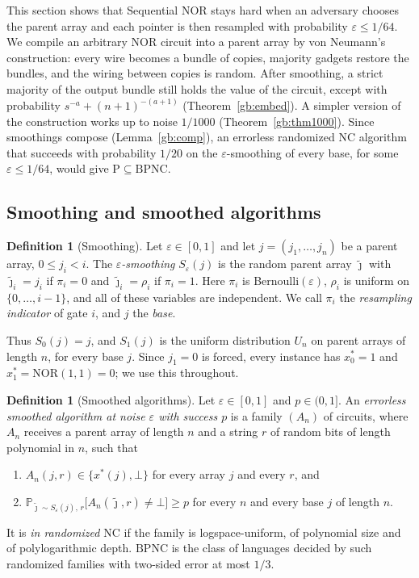 \documentclass[11pt]{amsart}
\theoremstyle{definition}
\newtheorem{definition}[theorem]{Definition}
\theoremstyle{remark}
\newcommand{\eps}{\varepsilon}
\newcommand{\jt}{\tilde{\jmath}}
\newcommand{\NOR}{\mathrm{NOR}}
\newcommand{\PP}{\mathbb{P}}
\begin{document}
This section shows that Sequential NOR stays hard when an adversary chooses
the parent array and each pointer is then resampled with probability
$\eps\le 1/64$. We compile an arbitrary NOR circuit into a parent array by von
Neumann's construction: every wire becomes a bundle of copies, majority
gadgets restore the bundles, and the wiring between copies is random. After
smoothing, a strict majority of the output bundle still holds the value of
the circuit, except with probability $s^{-a}+(n+1)^{-(a+1)}$
(Theorem~\ref{gb:embed}). A simpler version of the construction works up to
noise $1/1000$ (Theorem~\ref{gb:thm1000}). Since smoothings compose
(Lemma~\ref{gb:comp}), an errorless randomized $\mathrm{NC}$ algorithm that
succeeds with probability $1/20$ on the $\eps$-smoothing of every base, for
some $\eps\le 1/64$, would give $\mathrm{P}\subseteq\mathrm{BPNC}$.

\subsection{Smoothing and smoothed algorithms}\label{gb:sec-smooth}

\begin{definition}[Smoothing]\label{gb:smooth}
Let $\eps\in[0,1]$ and let $j=(j_1,\dots,j_n)$ be a parent array,
$0\le j_i<i$. The \emph{$\eps$-smoothing} $S_\eps(j)$ is the random parent
array $\jt$ with $\jt_i=j_i$ if $\pi_i=0$ and $\jt_i=\rho_i$ if $\pi_i=1$.
Here $\pi_i$ is Bernoulli$(\eps)$, $\rho_i$ is uniform on $\{0,\dots,i-1\}$,
and all of these variables are independent. We call $\pi_i$ the
\emph{resampling indicator} of gate $i$, and $j$ the \emph{base}.
\end{definition}

Thus $S_0(j)=j$, and $S_1(j)$ is the uniform distribution $U_n$ on parent
arrays of length $n$, for every base $j$. Since $j_1=0$ is forced, every
instance has $x^*_0=1$ and $x^*_1=\NOR(1,1)=0$; we use this throughout.

\begin{definition}[Smoothed algorithms]\label{gb:smalg}
Let $\eps\in[0,1]$ and $p\in(0,1]$. An \emph{errorless smoothed algorithm at
noise $\eps$ with success $p$} is a family $(A_n)$ of circuits, where $A_n$
receives a parent array of length $n$ and a string $r$ of random bits of
length polynomial in $n$, such that
\begin{enumerate}[label=(\roman*)]
\item $A_n(j,r)\in\{x^*(j),\bot\}$ for every array $j$ and every $r$, and
\item $\PP_{\jt\sim S_\eps(j),\,r}\bigl[A_n(\jt,r)\ne\bot\bigr]\ge p$ for
every $n$ and every base $j$ of length $n$.
\end{enumerate}
It is \emph{in randomized $\mathrm{NC}$} if the family is logspace-uniform,
of polynomial size and of polylogarithmic depth. $\mathrm{BPNC}$ is the class
of languages decided by such randomized families with two-sided error at
most $1/3$.
\end{definition}
\end{document}
